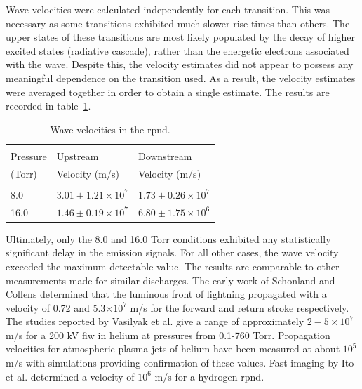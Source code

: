 Wave velocities were calculated independently for each transition. This was
necessary as some transitions exhibited much slower rise times than others. The
upper states of these transitions are most likely populated by the decay of
higher excited states (radiative cascade), rather than the energetic electrons
associated with the wave. Despite this, the velocity estimates did not appear to
possess any meaningful dependence on the transition used. As a result, the
velocity estimates were averaged together in order to obtain a single estimate.
The results are recorded in table~\ref{tbl:velocities}.
\begin{table}
  \centering
  \caption{Wave velocities in the \acs{rpnd}.}
  \label{tbl:velocities}
  \begin{tabular}{lll}
    \toprule                                                      \\
    Pressure  & Upstream                & Downstream              \\
    (Torr)    & Velocity (m/s)          & Velocity (m/s)          \\
    \midrule                                                      \\
    8.0       & $3.01\pm1.21\times10^7$ & $1.73\pm0.26\times10^7$ \\
    16.0      & $1.46\pm0.19\times10^7$ & $6.80\pm1.75\times10^6$ \\
  \end{tabular}
\end{table}

Ultimately, only the 8.0 and 16.0 Torr conditions exhibited any statistically
significant delay in the emission signals. For all other cases, the wave
velocity exceeded the maximum detectable value. The results are comparable to
other measurements made for similar discharges. The early work of Schonland and
Collens \cite{Schonland1933} determined that the luminous front of lightning
propagated with a velocity of 0.72 and 5.3$\times10^7$ m/s for the forward and
return stroke respectively. The studies reported by Vasilyak et al.
\cite{Vasilyak1994} give a range of approximately $2-5\times10^7$ m/s for a 200
kV \acs{fiw} in helium at pressures from 0.1-760 Torr. Propagation velocities
for atmospheric plasma jets of helium have been measured at about $10^5$ m/s
\cite{Lu2006} with simulations providing confirmation \cite{Naidis2010} of these
values. Fast imaging by Ito et al. \cite{Ito2010} determined a velocity of
$10^6$ m/s for a hydrogen \acs{rpnd}.

